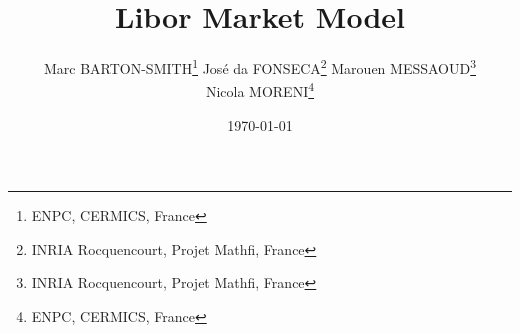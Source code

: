 \documentclass[10pt,a4paper,english]{article}
\begin{document}
\author{Marc BARTON-SMITH\footnote{ENPC, CERMICS, France} \quad Jos\'e da FONSECA\footnote{INRIA Rocquencourt, Projet Mathfi, France} \quad Marouen MESSAOUD\footnote{INRIA Rocquencourt, Projet Mathfi, France} \\ \quad Nicola MORENI\footnote{ENPC, CERMICS, France}}
\title{Libor Market Model}
\date{\today}
\maketitle
\thispagestyle{myheadings}
\tableofcontents

\vspace{10mm}
























 





\end{document}
